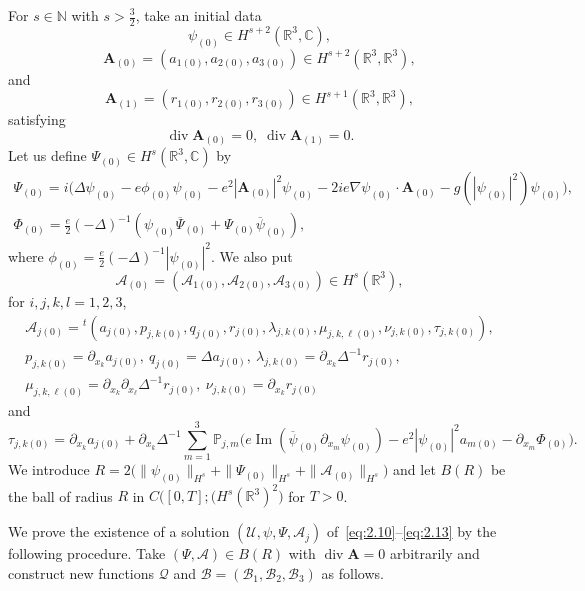\documentclass[10pt]{amsart}
\theoremstyle{definition}\newtheorem{defi}[theo]{Definition}\newtheorem{rema}[theo]{Remark}\newtheorem{exam}[theo]{Example}\newtheorem{exem}[theo]{Example}\newtheorem{nota}[theo]{Notation}
\newcommand{\BA}{\mathbf{A}}
\newcommand{\R}{\mathbb{R}}
\newcommand{\Com}{\mathbb{C}}
\newcommand{\N}{\mathbb{N}}
\DeclareMathOperator{\IM}{Im}
\DeclareMathOperator{\Div}{div}
\begin{document}
For $s \in \N$ with $s > \frac{3}{2}$, take an initial data
\[
\psi_{(0)} \in H^{s+2}(\R^3,\Com),
\]
\[
\BA_{(0)}=(a_{1(0)}, a_{2(0)}, a_{3(0)}) \in H^{s+2}(\R^3,\R^3),
\]
and
\[
\BA_{(1)}=(r_{1(0)},r_{2(0)},r_{3(0)}) \in H^{s+1}(\R^3,\R^3),
\]
satisfying
\[
\Div \BA_{(0)}=0, \;\Div \BA_{(1)}=0.
\]
Let us define $\Psi_{(0)} \in H^s(\R^3,\Com)$ by
\begin{equation}\label{Psi0}
\begin{gathered}
\Psi_{(0)}= i\big(\Delta \psi_{(0)} -e\phi_{(0)}\psi_{(0)}-e^2|\BA_{(0)}|^2 \psi_{(0)} -2ie\nabla \psi_{(0)}\cdot \BA_{(0)}-g(|\psi_{(0)}|^2)\psi_{(0)}\big),
\\
\Phi_{(0)}=\frac{e}{2}(-\Delta)^{-1} (\psi_{(0)} \overline{\Psi}_{(0)}
+\Psi_{(0)} \overline{\psi}_{(0)}),
\end{gathered}
\end{equation}
where $\phi_{(0)}= \frac{e}{2}(-\Delta)^{-1} | \psi_{(0)}|^2$.
We also put
\[
\mathcal{A}_{(0)}=(\mathcal{A}_{1(0)}, \mathcal{A}_{2(0)}, \mathcal{A}_{3(0)}) \in H^s(\R^3),
\]
for $i,j,k,l=1,2,3$,
\begin{gather*}
\mathcal{A}_{j(0)}= {}^t (a_{j(0)}, p_{j,k(0)}, q_{j(0)}, r_{j(0)},
\lambda_{j,k(0)}, \mu_{j,k,\ell(0)}, \nu_{j,k(0)}, \tau_{j,k(0)}),
\\
p_{j,k(0)}=\partial_{x_k} a_{j(0)}, \ q_{j(0)}=\Delta a_{j(0)}, \
\lambda_{j,k(0)}=\partial_{x_k} \Delta^{-1} r_{j(0)},
\\
\mu_{j,k,\ell(0)}= \partial_{x_k} \partial_{x_{\ell}} \Delta^{-1} r_{j(0)}, \
\nu_{j,k(0)}=\partial_{x_k} r_{j(0)}
\end{gather*}
and
\[
\tau_{j,k(0)}= \partial_{x_k} a_{j(0)} +\partial_{x_k} \Delta^{-1} \sum_{m=1}^3 \mathbb{P}_{j,m}
\big(e \IM (\overline{\psi}_{(0)}\partial_{x_m} \psi_{(0)}) -e^2 | \psi_{(0)}|^2 a_{m(0)}
- \partial_{x_m} \Phi_{(0)} \big).
\]
We introduce $R=2\big(\| \psi_{(0)} \|_{H^s}+\| \Psi_{(0)} \|_{H^s}+\| \mathcal{A}_{(0)} \|_{H^s}\big)$ and let $B(R)$ be the ball of radius $R$ in $C\big([0,T];(H^s(\R^3)^2\big)$ for $T>0$.

We prove the existence of a solution $(\mathcal{U}, \psi, \Psi, \mathcal{A}_j)$ of~\eqref{eq:2.10}--\eqref{eq:2.13} by the following procedure. Take $(\Psi, \mathcal{A}) \in B(R)$ with $\Div \BA=0$ arbitrarily and construct new functions $\mathcal{Q}$ and $\mathcal{B}=(\mathcal{B}_1,\mathcal{B}_2,\mathcal{B}_3)$ as follows.
\end{document}

